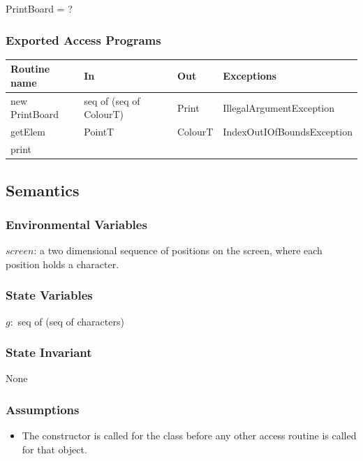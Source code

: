 \documentclass[12pt]{article}
\begin{document}
PrintBoard = ?

\subsubsection* {Exported Access Programs}

\begin{tabular}{| l | l | l | p{5.5cm} |}
\hline
\textbf{Routine name} & \textbf{In} & \textbf{Out} & \textbf{Exceptions}\\
\hline
new PrintBoard& seq of (seq of ColourT) & Print & IllegalArgumentException\\
\hline
getElem & PointT & ColourT & IndexOutIOfBoundsException\\
\hline
print& & & \\
\hline

\end{tabular}

\subsection* {Semantics}

\subsubsection*{Environmental Variables}

$screen$: a two dimensional sequence of positions on the screen, where each position holds a character.

\subsubsection* {State Variables}
$g:$ seq of (seq of characters)

\subsubsection* {State Invariant}

None

\subsubsection* {Assumptions}

\begin{itemize}

\item The constructor is called for the class before any other access routine is called for that object.

\end{itemize}
\end{document}
